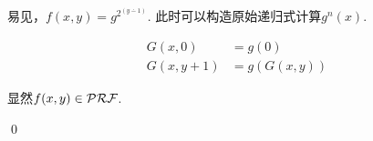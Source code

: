 \begin{pf} \rm 

易见，$f(x, y) = g^{2^{(y\dotminus 1)}}$. 此时可以构造原始递归式计算$g^n(x)$. 

$$
\begin{aligned}
G(x,0)&=g(0)\\
G(x,y+1)&=g(G(x, y))
\end{aligned}
$$

显然$f(x, y)\in\mathcal{PRF}$.

\qed
\end{pf}
